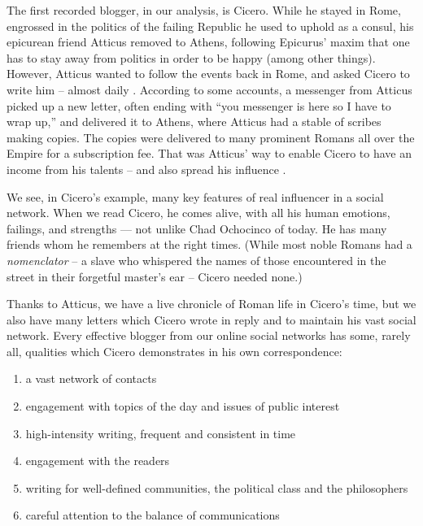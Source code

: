 \documentclass[10pt,oneside]{memoir}
\begin{document}
\begin{Spacing}{2}
The first recorded blogger, in our analysis, is Cicero.  While he stayed in Rome, engrossed in the politics of the failing Republic he used to uphold as a consul, his epicurean friend Atticus removed to Athens, following Epicurus' maxim that one has to stay away from politics in order to be happy (among other things).  However, Atticus wanted to follow the events back in Rome, and asked Cicero to write him -- almost daily \cite{butler2002cicero}.  According to some accounts, a messenger from Atticus picked up a new letter, often ending with ``you messenger is here so I have to wrap up,'' and delivered it to Athens, where Atticus had a stable of scribes making copies.  The copies were delivered to many prominent Romans all over the Empire for a subscription fee.  That was Atticus' way to enable Cicero to have an income from his talents -- and also spread his influence \cite{phillips1986atticus}.


We see, in Cicero's example, many key features of real influencer in a social network.  When we read Cicero, he comes alive, with all his human emotions, failings, and strengths --- not unlike Chad Ochocinco of today. He has many friends whom he remembers at the right times.  (While most noble Romans had a {\itshape nomenclator} -- a slave who whispered the names of those encountered in the street in their forgetful master's ear -- Cicero needed none.)


Thanks to Atticus, we have a live chronicle of Roman life in Cicero's time, but we also have many letters which Cicero wrote in reply and to maintain his vast social network. Every effective blogger from our online social networks has some, rarely all, qualities which Cicero demonstrates in his own correspondence:


\begin{enumerate}


\item a vast network of contacts

\item engagement with topics of the day and issues of public interest

\item high-intensity writing, frequent and consistent in time

\item engagement with the readers

\item writing for well-defined communities, the political class and the philosophers

\item \label{item:cicero-balance} careful attention to the balance of communications
\end{enumerate}


\end{Spacing}
\end{document}
